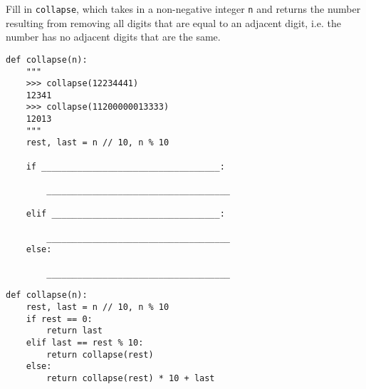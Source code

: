 \begin{blocksection}
\question
Fill in \lstinline{collapse}, which takes in a non-negative integer \lstinline{n} and returns the number resulting from removing all digits that are equal to an adjacent digit, i.e. the number has no adjacent digits that are the same.

\begin{lstlisting}
def collapse(n):
    """
    >>> collapse(12234441)
    12341
    >>> collapse(11200000013333)
    12013
    """
    rest, last = n // 10, n % 10

    if ___________________________________:

        ____________________________________

    elif _________________________________:

        ____________________________________
    else:

        ____________________________________
\end{lstlisting}
\end{blocksection}

\begin{blocksection}
\begin{solution}
\begin{lstlisting}
def collapse(n):
    rest, last = n // 10, n % 10
    if rest == 0:
        return last
    elif last == rest % 10:
        return collapse(rest)
    else:
        return collapse(rest) * 10 + last
\end{lstlisting}
\end{solution}
\end{blocksection}

